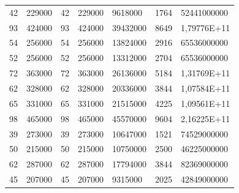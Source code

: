 \documentclass[a4paper]{scrreprt}
\begin{document}
\begin{enumerate}
\begin{table}
\begin{tiny}
\begin{tabular}{lllllll}
42                    & 229000                 & 42                  & 229000              & 9618000                                     & 1764                    & 52441000000             \\
93                    & 424000                 & 93                  & 424000              & 39432000                                    & 8649                    & 1,79776E+11             \\
54                    & 256000                 & 54                  & 256000              & 13824000                                    & 2916                    & 65536000000             \\
52                    & 256000                 & 52                  & 256000              & 13312000                                    & 2704                    & 65536000000             \\
72                    & 363000                 & 72                  & 363000              & 26136000                                    & 5184                    & 1,31769E+11             \\
62                    & 328000                 & 62                  & 328000              & 20336000                                    & 3844                    & 1,07584E+11             \\
65                    & 331000                 & 65                  & 331000              & 21515000                                    & 4225                    & 1,09561E+11             \\
98                    & 465000                 & 98                  & 465000              & 45570000                                    & 9604                    & 2,16225E+11             \\
39                    & 273000                 & 39                  & 273000              & 10647000                                    & 1521                    & 74529000000             \\
50                    & 215000                 & 50                  & 215000              & 10750000                                    & 2500                    & 46225000000             \\
62                    & 287000                 & 62                  & 287000              & 17794000                                    & 3844                    & 82369000000             \\
45                    & 207000                 & 45                  & 207000              & 9315000                                     & 2025                    & 42849000000             \\

\end{tabular}
\end{tiny}
\end{table}
\end{enumerate}
\end{document}

